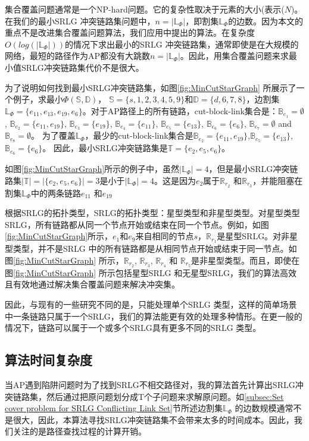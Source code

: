 集合覆盖问题通常是一个NP-hard问题。它的复杂性取决于元素的大小(表示($N$)。 在我们的最小SRLG 冲突链路集问题中，$n=|\mathbb{L}_{\Phi}|$，即割集$\mathbb{L}_{\Phi}$的边数。因为本文的重点不是改进集合覆盖问题算法，我们应用\cite{chvatal1979greedy}中提出的算法。在复杂度$O(log(|\mathbb{L}_{\Phi}|))$的情况下求出最小的SRLG 冲突链路集，通常即使是在大规模的网络，最短的路径作为AP都没有大跳数$n=|\mathbb{L}_{\Phi}|$。因此，用集合覆盖问题来求最小值SRLG冲突链路集代价不是很大。

为了说明如何找到最小SRLG冲突链路集，如图\ref{fig:MinCutStarGraph} 所展示了一个例子，求最小$\Phi(\mathbb{S},\mathbb{D})$， $\mathbb{S}=\{s, 1, 2, 3, 4, 5, 9\}$和$\mathbb{D}=\{d, 6, 7, 8\}$，边割集$\mathbb{L}_{\Phi}=\{e_{11},e_{13},e_{19},e_{6}\}$。对于AP路径上的所有链路，cut-block-link集合是：$\mathbb{B}_{e_1}=\emptyset$, $\mathbb{B}_{e_2}=\{e_{11},e_{19}\}$, $\mathbb{B}_{e_3}=\{e_{19}\}$, $\mathbb{B}_{e_4}=\{e_{11}\}$, $\mathbb{B}_{e_5}=\{e_{13}\}$, $\mathbb{B}_{e_6}=\{e_6\}$, $\mathbb{B}_{e_7}=\emptyset$ and $\mathbb{B}_{e_8}=\emptyset$。 为了覆盖$\mathbb{L}_{\Phi}$，最少的cut-block-link集合是$\mathbb{B}_{e_2}=\{e_{11},e_{19}\}$,$\mathbb{B}_{e_5}=\{e_{13}\}$,$\mathbb{B}_{e_6}=\{e_6\}$。 因此，最小SRLG冲突链路集是$\mathbb{T}=\{e_2, e_5, e_6 \}$。

如图\ref{fig:MinCutStarGraph}所示的例子中，虽然$|\mathbb{L}_{\Phi}|=4$，但是最小SRLG冲突链路集$|\mathbb{T}|=|\{e_2, e_5, e_6 \}|=3$是小于$|\mathbb{L}_{\Phi}|=4$。这是因为$e_2$属于$\mathbb{R}_{r_2}$ 和$\mathbb{R}_{r_3}$，并能阻塞在割集$\mathbb{L}_{\Phi}$中的两条链路$e_{11}$ 和$e_{19}$


根据SRLG的拓扑类型\cite{datta2008graph}，SRLG的拓扑类型：星型类型和非星型类型。对星型类型SRLG，所有链路都从同一个节点开始或结束在同一个节点。例如，如图\ref{fig:MinCutStarGraph}所示，$e_1$和$e_9$来自相同的节点$s$，$\mathbb{R}_{r_1}$是星型SRLG。对非星型类型，并不是SRLG 中的所有链路都是从相同节点开始或结束于同一节点。如图\ref{fig:MinCutStarGraph} 所示，$\mathbb{R}_{r_2}$, $\mathbb{R}_{r_3}$, $\mathbb{R}_{r_4}$ 和 $\mathbb{R}_{r_5}$是非星型类型。而且，即使在图\ref{fig:MinCutStarGraph} 所示包括星型SRLG 和无星型SRLG，我们的算法高效且有效地通过解决集合覆盖问题来解决冲突集。


因此，与现有的一些研究不同的是，\cite{datta2008graph}只能处理单个SRLG 类型，这样的简单场景中一条链路只属于一个SRLG，我们的算法能更有效的处理多种情形。在更一般的情况下，链路可以属于一个或多个SRLG具有更多不同的SRLG 类型。

\subsection{算法时间复杂度}
\label{subsec:Complexity analysis}
当AP遇到陷阱问题时为了找到SRLG不相交路径对，我的算法首先计算出SRLG冲突链路集，然后通过把原问题划分成T个子问题来求解原问题。如\ref{subsec:Set cover problem for SRLG Conflicting Link Set}节所述边割集$\mathbb{L}_{\Phi}$ 的边数规模通常不是很大，因此，本算法寻找SRLG冲突链路集不会带来太多的时间成本。因此，我们关注的是路径查找过程的计算开销。

